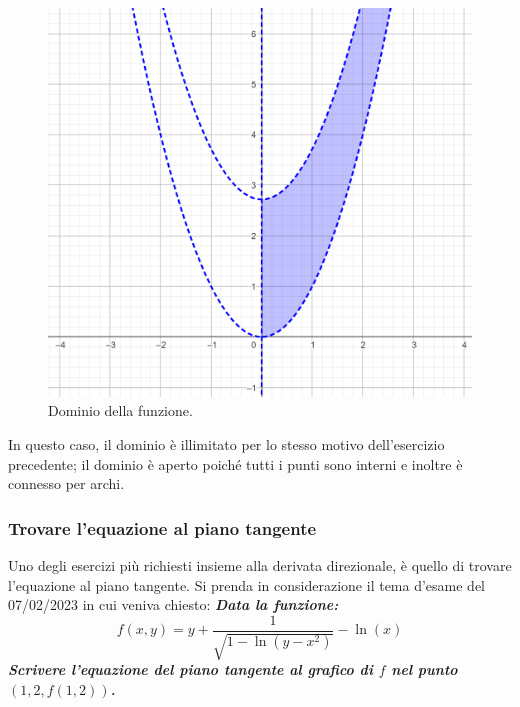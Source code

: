\documentclass[a4paper]{article}
\begin{document}
	\begin{figure}[!htp]
		\centering
		\includegraphics[width=\textwidth]{img/grafico-ex3-5.png}
		\caption*{Dominio della funzione.}
	\end{figure}

	\noindent
	In questo caso, il dominio è illimitato per lo stesso motivo dell'esercizio precedente; il dominio è aperto poiché tutti i punti sono interni e inoltre è connesso per archi.\newpage

	\subsubsection{Trovare l'equazione al piano tangente}\label{par: trovare l'equazione al piano tangente}

	Uno degli esercizi più richiesti insieme alla derivata direzionale, è quello di trovare l'equazione al piano tangente. Si prenda in considerazione il tema d'esame del 07/02/2023 in cui veniva chiesto: \textcolor{Green4}{\textbf{\emph{Data la funzione:}}
	\begin{equation*}
		f\left(x,y\right) = y + \dfrac{1}{\sqrt{1 - \ln\left(y - x^{2}\right)}} - \ln\left(x\right)
	\end{equation*}
	\textbf{\emph{Scrivere l'equazione del piano tangente al grafico di $f$ nel punto $\left(1, 2, f\left(1,2\right)\right)$.}}}\newline
\end{document}

